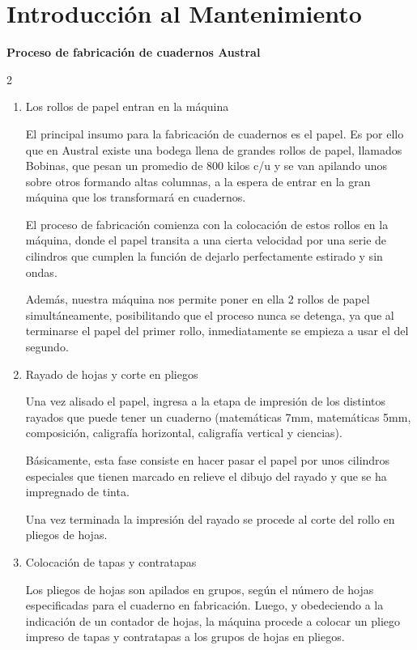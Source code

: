 \documentclass[../main]{subfiles}
\begin{document}
\section{Introducción al Mantenimiento}
\textbf{Proceso de fabricación de cuadernos Austral}
\begin{multicols}{2}
\begin{enumerate}
\large
\item Los rollos de papel entran en la máquina

El  principal insumo para la fabricación de cuadernos es el papel. Es por ello que en Austral existe una bodega llena de grandes rollos de papel, llamados Bobinas, que pesan un promedio de 800 kilos c/u y se van apilando unos sobre otros formando altas columnas, a la espera de entrar en la gran máquina que los transformará en cuadernos.

El proceso de fabricación comienza con la colocación de estos rollos en la máquina, donde el papel transita a una cierta velocidad por una serie de cilindros que cumplen la función de dejarlo perfectamente estirado y sin ondas.

Además, nuestra máquina nos permite poner en ella 2 rollos de papel simultáneamente, posibilitando que el proceso nunca se detenga, ya que al terminarse el papel del primer rollo, inmediatamente se empieza a usar el del segundo.

\item Rayado de hojas y corte en pliegos

Una vez alisado el papel, ingresa a la etapa de impresión de los distintos rayados que puede tener un cuaderno (matemáticas 7mm, matemáticas 5mm, composición, caligrafía horizontal, caligrafía vertical y ciencias).

Básicamente, esta fase consiste en hacer pasar el papel por unos cilindros especiales que tienen marcado en relieve el dibujo del rayado y que se ha impregnado de tinta.

Una vez terminada la impresión del rayado se procede al corte del rollo en pliegos de hojas.

\item Colocación de tapas y contratapas

Los pliegos de hojas son apilados en grupos, según el número de hojas especificadas para el cuaderno en fabricación. Luego, y obedeciendo a la indicación de un contador de hojas, la máquina procede a colocar un pliego impreso de tapas y contratapas a los grupos de hojas en pliegos.


\end{enumerate}
\end{multicols}
\end{document}

